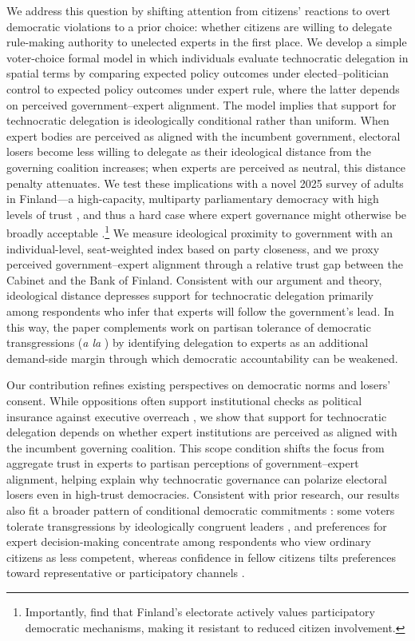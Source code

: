 \documentclass[11pt]{article}\usepackage[]{graphicx}\usepackage[]{xcolor}
\begin{document}
We address this question by shifting attention from citizens' reactions to overt democratic violations to a prior choice: whether citizens are willing to delegate rule-making authority to unelected experts in the first place. We develop a simple voter-choice formal model in which individuals evaluate technocratic delegation in spatial terms by comparing expected policy outcomes under elected--politician control to expected policy outcomes under expert rule, where the latter depends on perceived government--expert alignment. The model implies that support for technocratic delegation is ideologically conditional rather than uniform. When expert bodies are perceived as aligned with the incumbent government, electoral losers become less willing to delegate as their ideological distance from the governing coalition increases; when experts are perceived as neutral, this distance penalty attenuates. We test these implications with a novel 2025 survey of adults in Finland---a high-capacity, multiparty parliamentary democracy with high levels of trust \parencite{Soderlund2019}, and thus a hard case where expert governance might otherwise be broadly acceptable \parencite[150]{Rapeli2016}.\footnote{Importantly, \textcite[]{Bengtsson2009} find that Finland's electorate actively values participatory democratic mechanisms, making it resistant to reduced citizen involvement.} We measure ideological proximity to government with an individual-level, seat-weighted index based on party closeness, and we proxy perceived government--expert alignment through a relative trust gap between the Cabinet and the Bank of Finland. Consistent with our argument and theory, ideological distance depresses support for technocratic delegation primarily among respondents who infer that experts will follow the government's lead. In this way, the paper complements work on partisan tolerance of democratic transgressions (\emph{a la} \cite{Svolik2020, Svolik2019}) by identifying delegation to experts as an additional demand-side margin through which democratic accountability can be weakened.

Our contribution refines existing perspectives on democratic norms and losers' consent. While oppositions often support institutional checks as political insurance against executive overreach \parencite{Capoccia2007a}, we show that support for technocratic delegation depends on whether expert institutions are perceived as aligned with the incumbent governing coalition. This scope condition shifts the focus from aggregate trust in experts to partisan perceptions of government--expert alignment, helping explain why technocratic governance can polarize electoral losers even in high-trust democracies. Consistent with prior research, our results also fit a broader pattern of conditional democratic commitments \parencite{Saarinen2020}: some voters tolerate transgressions by ideologically congruent leaders \parencite{GRAHAM2020,Saikkonen2022}, and preferences for expert decision-making concentrate among respondents who view ordinary citizens as less competent, whereas confidence in fellow citizens tilts preferences toward representative or participatory channels \parencite{Rapeli2023}.
\end{document}
